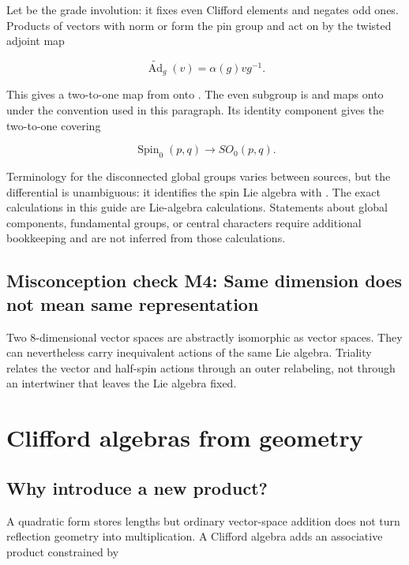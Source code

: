 \documentclass[11pt]{article}
\begin{document}
Let \texttt{} be the grade involution: it fixes even Clifford elements and negates odd ones. Products of vectors with norm \texttt{} or \texttt{} form the pin group and act on \texttt{} by the twisted adjoint map

\[
\widetilde{\operatorname{Ad}}_g(v)=\alpha(g)vg^{-1}.
\]

This gives a two-to-one map from \texttt{} onto \texttt{}. The even subgroup is \texttt{} and maps onto \texttt{} under the convention used in this paragraph. Its identity component gives the two-to-one covering

\[
\operatorname{Spin}_0(p,q)\longrightarrow SO_0(p,q).
\]

Terminology for the disconnected global groups varies between sources, but the differential is unambiguous: it identifies the spin Lie algebra with \texttt{}. The exact calculations in this guide are Lie-algebra calculations. Statements about global components, fundamental groups, or central characters require additional bookkeeping and are not inferred from those calculations.

\subsection{Misconception check M4: Same dimension does not mean same representation}

Two 8-dimensional vector spaces are abstractly isomorphic as vector spaces. They can nevertheless carry inequivalent actions of the same Lie algebra. Triality relates the vector and half-spin actions through an outer relabeling, not through an intertwiner that leaves the Lie algebra fixed.

\section{Clifford algebras from geometry}

\subsection{Why introduce a new product?}

A quadratic form stores lengths but ordinary vector-space addition does not turn reflection geometry into multiplication. A Clifford algebra adds an associative product constrained by
\end{document}
